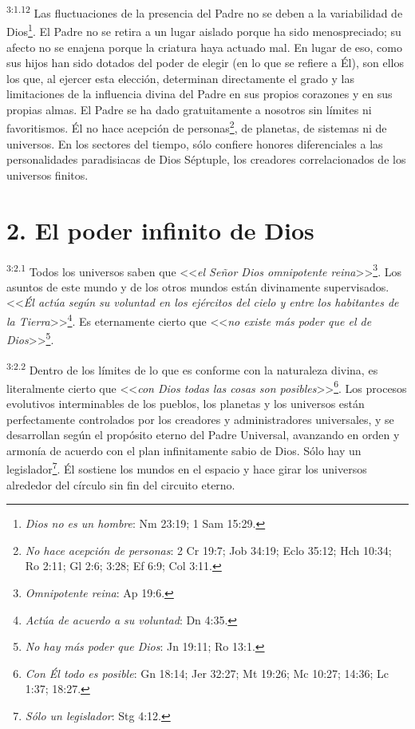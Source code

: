 \par
\textsuperscript{3:1.12} Las fluctuaciones de la presencia del Padre no se deben a la variabilidad de Dios\footnote{\textit{Dios no es un hombre}: Nm 23:19; 1 Sam 15:29.}. El Padre no se retira a un lugar aislado porque ha sido menospreciado; su afecto no se enajena porque la criatura haya actuado mal. En lugar de eso, como sus hijos han sido dotados del poder de elegir (en lo que se refiere a Él), son ellos los que, al ejercer esta elección, determinan directamente el grado y las limitaciones de la influencia divina del Padre en sus propios corazones y en sus propias almas. El Padre se ha dado gratuitamente a nosotros sin límites ni favoritismos. Él no hace acepción de personas\footnote{\textit{No hace acepción de personas}: 2 Cr 19:7; Job 34:19; Eclo 35:12; Hch 10:34; Ro 2:11; Gl 2:6; 3:28; Ef 6:9; Col 3:11.}, de planetas, de sistemas ni de universos. En los sectores del tiempo, sólo confiere honores diferenciales a las personalidades paradisiacas de Dios Séptuple, los creadores correlacionados de los universos finitos.

\section*{2. El poder infinito de Dios}
\par
\textsuperscript{3:2.1} Todos los universos saben que <<\textit{el Señor Dios omnipotente reina}>>\footnote{\textit{Omnipotente reina}: Ap 19:6.}. Los asuntos de este mundo y de los otros mundos están divinamente supervisados. <<\textit{Él actúa según su voluntad en los ejércitos del cielo y entre los habitantes de la Tierra}>>\footnote{\textit{Actúa de acuerdo a su voluntad}: Dn 4:35.}. Es eternamente cierto que <<\textit{no existe más poder que el de Dios}>>\footnote{\textit{No hay más poder que Dios}: Jn 19:11; Ro 13:1.}.

\par
\textsuperscript{3:2.2} Dentro de los límites de lo que es conforme con la naturaleza divina, es literalmente cierto que <<\textit{con Dios todas las cosas son posibles}>>\footnote{\textit{Con Él todo es posible}: Gn 18:14; Jer 32:27; Mt 19:26; Mc 10:27; 14:36; Lc 1:37; 18:27.}. Los procesos evolutivos interminables de los pueblos, los planetas y los universos están perfectamente controlados por los creadores y administradores universales, y se desarrollan según el propósito eterno del Padre Universal, avanzando en orden y armonía de acuerdo con el plan infinitamente sabio de Dios. Sólo hay un legislador\footnote{\textit{Sólo un legislador}: Stg 4:12.}. Él sostiene los mundos en el espacio y hace girar los universos alrededor del círculo sin fin del circuito eterno.

